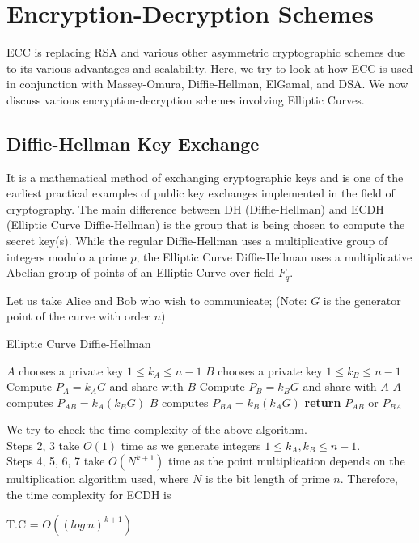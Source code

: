 \section{Encryption-Decryption Schemes}
ECC is replacing RSA and various other asymmetric cryptographic schemes due to its various advantages and scalability. Here, we try to look at how ECC is used in conjunction with Massey-Omura, Diffie-Hellman, ElGamal, and DSA. \newline
We now discuss various encryption-decryption schemes involving Elliptic Curves.


\subsection{Diffie-Hellman Key Exchange}
It is a mathematical method of exchanging cryptographic keys and is one of the earliest practical examples of public key exchanges implemented in the field of cryptography.
The main difference between DH (Diffie-Hellman) and ECDH (Elliptic Curve Diffie-Hellman) is the group that is being chosen to compute the secret key(s). While the regular Diffie-Hellman uses a multiplicative group of integers modulo a prime $p$, the Elliptic Curve Diffie-Hellman uses a multiplicative Abelian group of points of an Elliptic Curve over field $F_q$. \newline

\noindent Let us take Alice and Bob who wish to communicate;\newline
\noindent (Note: $G$ is the generator point of the curve with order $n$)

\begin{algorithm}
\caption{Elliptic Curve Diffie-Hellman}\label{ECDH}
\begin{algorithmic}[1]
\State $A$ chooses a private key $1 \leq k_A \leq n-1 $
\State $B$ chooses a private key $1 \leq k_B \leq n-1 $
\State Compute $P_A = k_AG$ and share with $B$
\State Compute $P_B = k_BG$ and share with $A$
\State $A$ computes $P_{AB} = k_A(k_BG)$
\State $B$ computes $P_{BA} = k_B(k_AG)$
\State \textbf{return} $P_{AB}$ or $P_{BA}$
\EndProcedure
\end{algorithmic}
\end{algorithm}

\noindent We try to check the time complexity of the above algorithm. 
\\Steps 2, 3 take $O(1)$ time as we generate integers $1 \leq k_A, k_B \leq n - 1$.
\\Steps 4, 5, 6, 7 take $O(N^{k+1})$ time as the point multiplication depends on the multiplication algorithm used, where $N$ is the bit length of prime $n$. Therefore, the time complexity for ECDH is
\begin{center}
T.C = $O((log\:n)^{k+1})$
\end{center}

